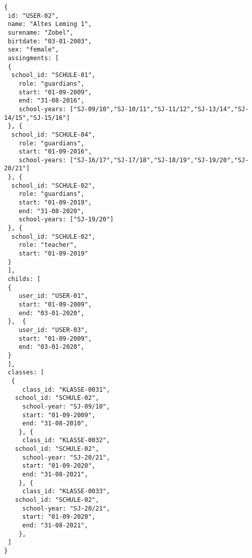 
\begin{lstlisting}[caption={Beispiel 1 Lehrer + Eltern},frame=tlrb]
{
 id: "USER-02",
 name: "Altes Leming 1",
 surename: "Zobel",
 birtdate: "03-01-2003",
 sex: "female",
 assingments: [
 {
  school_id: "SCHULE-01",
	role: "guardians",
	start: "01-09-2009",
	end: "31-08-2016",
	school-years: ["SJ-09/10","SJ-10/11","SJ-11/12","SJ-13/14","SJ-14/15","SJ-15/16"]
 }, {
  school_id: "SCHULE-04",
	role: "guardians",
	start: "01-09-2016",
	school-years: ["SJ-16/17","SJ-17/18","SJ-18/19","SJ-19/20","SJ-20/21"]
 }, {
  school_id: "SCHULE-02",
	role: "guardians",
	start: "01-09-2019",
	end: "31-08-2020",
	school-years: ["SJ-19/20"]
 }, {
  school_id: "SCHULE-02",
	role: "teacher",
	start: "01-09-2019"
 }
 ],
 childs: [
 {
	user_id: "USER-01",
	start: "01-09-2009",
	end: "03-01-2020",
 },  {
	user_id: "USER-03",
	start: "01-09-2009",
	end: "03-01-2020",
 }
 ],
 classes: [
  {
	 class_id: "KLASSE-0031",
   school_id: "SCHULE-02",
	 school-year: "SJ-09/10",
	 start: "01-09-2009",
	 end: "31-08-2010",
	}, {
	 class_id: "KLASSE-0032",
   school_id: "SCHULE-02",
	 school-year: "SJ-20/21",
	 start: "01-09-2020",
	 end: "31-08-2021",
	}, {
	 class_id: "KLASSE-0033",
   school_id: "SCHULE-02",
	 school-year: "SJ-20/21",
	 start: "01-09-2020",
	 end: "31-08-2021",
	}, 
 ]
}
\end{lstlisting}